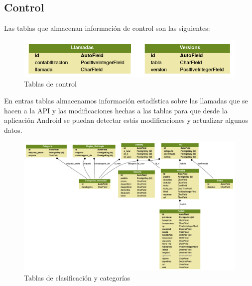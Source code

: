 \subsection{Control}
Las tablas que almacenan información de control son las siguientes:
\begin{center}
\centering
\begin{figure}[h]
\includegraphics[scale=0.5]{basededatos/semandal_control.png}
\caption{Tablas de control}
\label{fig:control}
\end{figure}
\end{center}
En entras tablas almacenamos información estadística sobre las llamadas que se hacen a la API y las modificaciones hechas a las tablas para que desde la aplicación Android se puedan detectar estás modificaciones y actualizar algunos datos.
\begin{figure}
\begin{center}
\includegraphics[scale=0.4]{basededatos/semandal_categorias2.png}
\caption{Tablas de clasificación y categorías}
\label{fig:categorias}
\end{center}
\end{figure}
